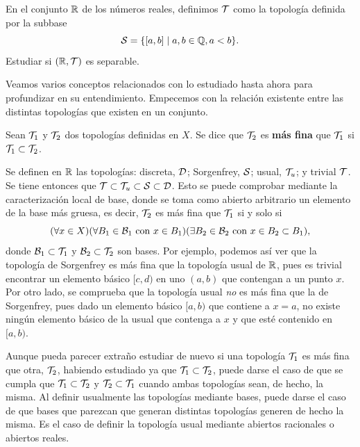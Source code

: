 \begin{ex}
    En el conjunto \(\mathbb{R}\) de los números reales, definimos \(\mathcal{T}\) como la topología definida por la subbase 
    \[
        \mathcal{S} = \{[a,b] \mid a, b \in \mathbb{Q}, a < b\}.
    \]
    Estudiar si \((\mathbb{R},\mathcal{T})\) es separable.
\end{ex}

{}

\begin{amp}
    Veamos varios conceptos relacionados con lo estudiado hasta ahora para profundizar en su entendimiento. Empecemos con la relación existente entre las distintas topologías que existen en un conjunto.
    \begin{deff}
        Sean $\mathcal{T}_1$ y $\mathcal{T}_2$ dos topologías definidas en $X$. Se dice que $\mathcal{T}_2$ es {\bf más fina} que $\mathcal{T}_1$ si $\mathcal{T}_1\subset\mathcal{T}_2$.
    \end{deff}
    \begin{ej}
        Se definen en $\mathbb{R}$ las topologías: discreta, $\mathcal{D}$; Sorgenfrey, $\mathcal{S}$; usual, $\mathcal{T}_u$; y trivial $\mathcal{T}$. Se tiene entonces que $\mathcal{T} \subset\mathcal{T}_u \subset\mathcal{S} \subset\mathcal{D}$. Esto se puede comprobar 
        mediante la caracterización local de base, donde se toma como abierto arbitrario un elemento de la base más gruesa, es decir, $\mathcal{T}_2$ es más fina que $\mathcal{T}_1$ si y solo si
        \[
            (\forall x \in X) (\forall B_1 \in \mathcal{B}_1 \text{ con } x\in B_1) (\exists B_2 \in\mathcal{B}_2 \text{ con } x\in B_2 \subset B_1),
        \]
        donde $\mathcal{B}_1\subset\mathcal{T}_1$ y $\mathcal{B}_2\subset\mathcal{T}_2$ son bases. Por ejemplo, podemos así ver que la topología de Sorgenfrey es más fina que la topología usual de $\mathbb{R}$, pues es trivial encontrar un elemento básico $[c,d)$ en uno $(a,b)$ que contengan a un punto $x$. Por otro lado, se comprueba que la topología usual \textit{no} es más fina que la de Sorgenfrey, pues dado un elemento básico $[a,b)$ que contiene a $x = a$, no existe ningún elemento básico de la usual que contenga a $x$ y que esté contenido en $[a,b)$.
    \end{ej}
    Aunque pueda parecer extraño estudiar de nuevo si una topología $\mathcal{T}_1$ es más fina que otra, $\mathcal{T}_2$, habiendo estudiado ya que $\mathcal{T}_1 \subset \mathcal{T}_2$, puede darse el caso de que se cumpla que $\mathcal{T}_1 \subset \mathcal{T}_2$ y $\mathcal{T}_2 \subset \mathcal{T}_1$ cuando ambas topologías sean, de hecho, la misma. Al definir usualmente las topologías mediante bases, puede darse el caso de que bases que parezcan que generan distintas topologías generen de hecho la misma. Es el caso de definir la topología usual mediante abiertos racionales o abiertos reales.


\end{amp}

